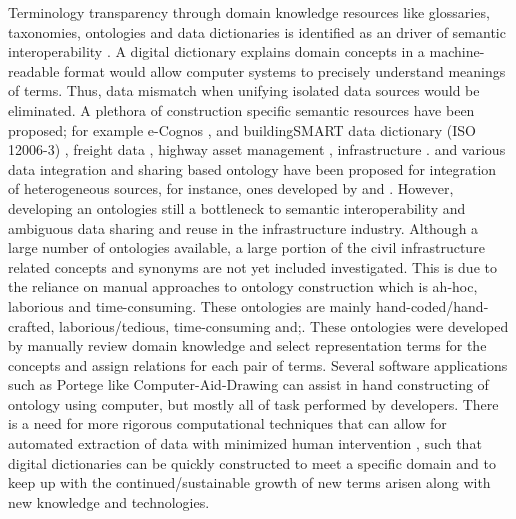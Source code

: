 \documentclass[Journal,InsideFigs, DoubleSpace]{ascelike} %
\begin{document}
Terminology transparency through domain knowledge resources like glossaries, taxonomies, ontologies and data dictionaries is identified as an driver of semantic interoperability \cite{ouksel99}. A digital dictionary explains domain concepts in a machine-readable format would allow computer systems to precisely understand meanings of terms. Thus, data mismatch when unifying isolated data sources would be eliminated. A plethora of construction specific semantic resources have been proposed; for example e-Cognos \cite{wetherill02}, and buildingSMART data dictionary (ISO 12006-3) \cite{buildingsmartData}, freight data \cite{seedah15}, highway asset management \cite{el-diraby05}, infrastructure \cite{osman06}. and various data integration and sharing based ontology have been proposed for integration of heterogeneous sources, for instance, ones developed by \cite{buitelaar08} and \cite{seng09}. However, developing an ontologies still a bottleneck to semantic interoperability and ambiguous data sharing and reuse in the infrastructure industry. Although a large number of ontologies available, a large portion of the civil infrastructure related concepts and synonyms are not yet included investigated. This is due to the reliance on manual approaches to ontology construction which is ah-hoc, laborious and time-consuming. These ontologies are mainly hand-coded/hand-crafted, laborious/tedious, time-consuming and;. These ontologies were developed by manually review domain knowledge and select representation terms for the concepts and assign relations for each pair of terms. Several software applications such as Portege like Computer-Aid-Drawing can assist in hand constructing of ontology using computer, but mostly all of task performed by developers. There is a need for more rigorous computational techniques that can allow for automated extraction of data with minimized human intervention \cite{mounce10}, such that digital dictionaries can be quickly constructed to meet a specific domain and to keep up with the continued/sustainable growth of new terms arisen along with new knowledge and technologies.
\par
\end{document}
